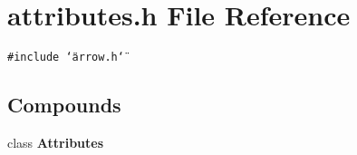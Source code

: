 \section{attributes.h File Reference}
\label{attributes_8h}
{\tt \#include \char`\"{}arrow.h\char`\"{}}\par
\subsection*{Compounds}
\begin{CompactItemize}
\item 
class {\bf Attributes}
\end{CompactItemize}
